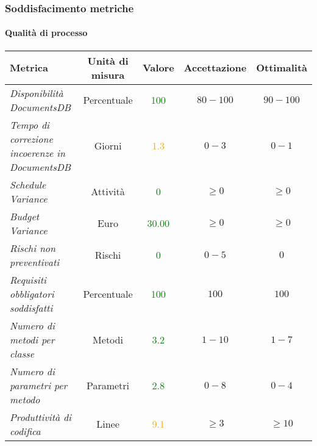 \newpage
\subsubsection{Soddisfacimento metriche}

\paragraph{Qualità di processo}
\begin{longtable}{|>{\centering}m{5cm}|c|c|c|c|}
\hline
\textbf{Metrica} & \textbf{Unità di misura} & \textbf{Valore} & \textbf{Accettazione} & \textbf{Ottimalità}\\
\hline
\endhead
\emph{Disponibilità DocumentsDB} & {Percentuale} & \textcolor{Green}{100} & $80 - 100$ & $90 - 100$\\ \hline
\emph{Tempo di correzione incoerenze in DocumentsDB} & {Giorni} & \textcolor{Orange}{1.3} & $0 - 3$ & $0 - 1$\\ \hline
\emph{Schedule Variance} & {Attività} & \textcolor{Green}{0} & $\geq 0$  & $\geq 0$\\ \hline
\emph{Budget Variance} & {Euro} & \textcolor{Green}{30.00} & $\geq 0$ & $\geq 0$\\ \hline
\emph{Rischi non preventivati} & {Rischi} & \textcolor{Green}{0} & $0 - 5$ & $0$\\ \hline
\emph{Requisiti obbligatori soddisfatti} & {Percentuale} & \textcolor{Green}{100} & $100$ & $100$\\ \hline
\emph{Numero di metodi per classe} & {Metodi} & \textcolor{Green}{3.2} & $1 - 10$ & $1 - 7$\\ \hline
\emph{Numero di parametri per metodo} & {Parametri} & \textcolor{Green}{2.8} & $0 - 8$ & $0 - 4$\\ \hline
\emph{Produttività di codifica} & {Linee} & \textcolor{Orange}{9.1} & $\geq 3$ & $\geq 10$\\ \hline

\end{longtable}
